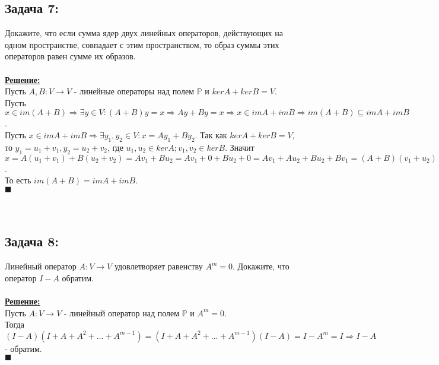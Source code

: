 \documentclass[a4paper,12pt,titlepage,final]{article}
\begin{document}
\subsection*{Задача 7:}
\noindent Докажите, что если сумма ядер двух линейных операторов, действующих на одном пространстве, совпадает с этим пространством,
то образ суммы этих операторов равен сумме их образов. \\ \\
\textbf{\underline{Решение:}} \\
Пусть $A, B: V \rightarrow V$ - линейные операторы над полем $\mathbb{P}$ и $kerA + kerB = V$. \\
Пусть $x \in im(A + B) \Rightarrow \exists y \in V: (A + B)y = x \Rightarrow Ay + By = x \Rightarrow x \in imA + imB
\Rightarrow im(A + B) \subseteq imA + imB$. \\
Пусть $x \in imA + imB \Rightarrow \exists y_1, y_2 \in V: x = Ay_1 + By_2$. Так как $kerA + kerB = V$, то
$y_1 = u_1 + v_1, y_2 = u_2 + v_2$, где $u_1, u_2 \in kerA; v_1, v_2 \in kerB$. Значит $x = A(u_1 + v_1) + B(u_2 + v_2) =
Av_1 + Bu_2 = Av_1 + 0 + Bu_2 + 0 = Av_1 + Au_2 + Bu_2 + Bv_1 = (A + B)(v_1 + u_2) \Rightarrow x \in im(A + B)
\Rightarrow imA + imB \subseteq im(A + B)$.\\
То есть $im(A + B) = imA + imB$. \\ $\blacksquare$ \\ \\ \\


\subsection*{Задача 8:}
\noindent Линейный оператор $A: V \rightarrow V$ удовлетворяет равенству $A^m = 0$. Докажите, что оператор
$I - A$ обратим. \\ \\
\textbf{\underline{Решение:}} \\
Пусть $A: V \rightarrow V$ - линейный оператор над полем $\mathbb{P}$ и $A^m = 0$. \\
Тогда $(I - A)(I + A + A^2 + ... + A^{m-1}) = (I + A + A^2 + ... + A^{m-1})(I - A) = I - A^m = I \Rightarrow I - A$ - обратим. \\ $\blacksquare$ \\ \\ \\
\end{document}
